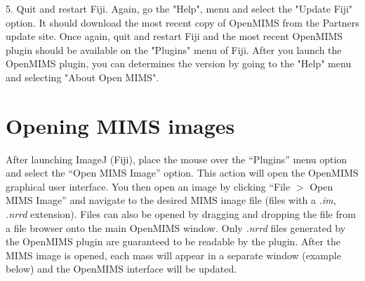 \documentclass{article}
\begin{document}
	5.  Quit and restart Fiji.   Again, go the "Help", menu and select the "Update Fiji" option.  It should download the most recent copy of OpenMIMS from the Partners update site.    Once again, quit and restart Fiji and the most recent OpenMIMS plugin should be available on the "Plugins" menu of Fiji.  After you launch the OpenMIMS plugin, you can determines the version by going to the "Help" menu and selecting "About Open MIMS".
	

\section*{Opening MIMS images }
	After launching ImageJ (Fiji), place the mouse over the ``Plugins'' menu option and select the 
	``Open MIMS Image''  option. This action will open the OpenMIMS graphical user interface. You 
	then open an image by clicking ``File $>$ Open MIMS Image'' and navigate to the desired
	MIMS image file (files with a \textit{.im}, \textit{.nrrd} extension). 
	Files can also be opened by dragging and dropping the file
	from a file browser onto the main OpenMIMS window. 
	Only \textit{.nrrd} files generated by the OpenMIMS plugin are guaranteed to be readable by the plugin.
	After the MIMS image is opened, each mass will appear in a separate window (example below) and the 
	OpenMIMS interface will be updated.
\end{document}
